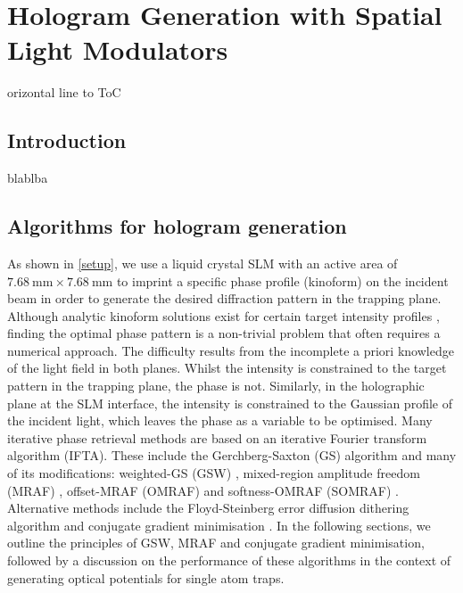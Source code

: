 \documentclass[../Thesis-IJspeert.tex]{subfiles}
\begin{document}
\graphicspath{ {"Hologram Generation with Spatial Light Modulators/figs/"} }

\chapter{Hologram Generation with Spatial Light Modulators}
orizontal line to ToC
\label{chap:HologramGenerationwithSpatialLightModulators}

\section{Introduction}
blablba

\section{Algorithms for hologram generation}
As shown in \autoref{setup}, we use a liquid crystal SLM with an active area of $\SI{7.68}{\milli\meter} \times\SI{7.68}{\milli\meter}$ to imprint a specific phase profile (kinoform) on the incident beam in order to generate the desired diffraction pattern in the trapping plane. Although analytic kinoform solutions exist for certain target intensity profiles \cite{Matsumoto2008,Moulder2012}, finding the optimal phase pattern is a non-trivial problem that often requires a numerical approach. The difficulty results from the incomplete a priori knowledge of the light field in both planes. Whilst the intensity is constrained to the target pattern in the trapping plane, the phase is not. Similarly, in the holographic plane at the SLM interface, the intensity is constrained to the Gaussian profile of the incident light, which leaves the phase as a variable to be optimised. Many iterative phase retrieval methods are based on an iterative Fourier transform algorithm (IFTA). These include the Gerchberg-Saxton (GS) algorithm \cite{GS} and many of its modifications: weighted-GS (GSW) \cite{DiLeonardo2007}, mixed-region amplitude freedom (MRAF) \cite{Pasienski2008}, offset-MRAF (OMRAF) \cite{Gaunt2012} and softness-OMRAF (SOMRAF) \cite{somraf}. Alternative methods include the Floyd-Steinberg error diffusion dithering algorithm \cite{floyd} and conjugate gradient minimisation \cite{Harte2014}. In the following sections, we outline the principles of GSW, MRAF and conjugate gradient minimisation, followed by a discussion on the performance of these algorithms in the context of generating optical potentials for single atom traps.
\end{document}
